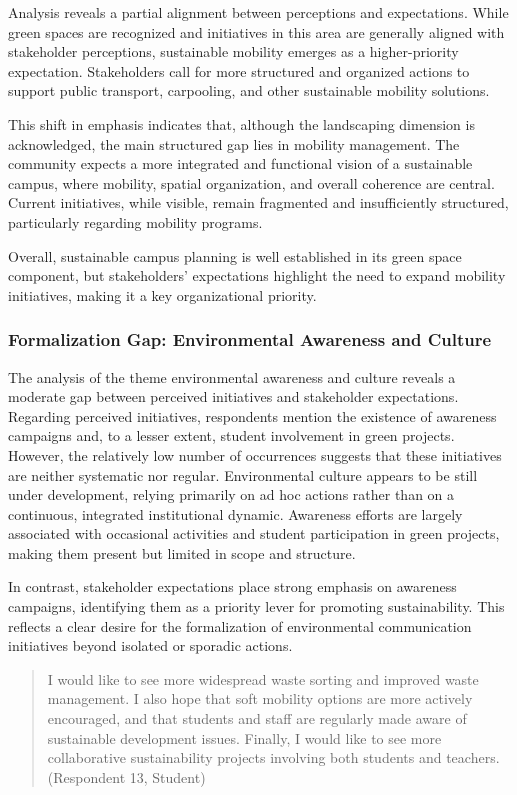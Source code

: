 \documentclass[12pt,a4paper]{article}
\begin{document}
Analysis reveals a partial alignment between perceptions and expectations. While green spaces are recognized and initiatives in this area are generally aligned with stakeholder perceptions, sustainable mobility emerges as a higher-priority expectation. Stakeholders call for more structured and organized actions to support public transport, carpooling, and other sustainable mobility solutions.

This shift in emphasis indicates that, although the landscaping dimension is acknowledged, the main structured gap lies in mobility management. The community expects a more integrated and functional vision of a sustainable campus, where mobility, spatial organization, and overall coherence are central. Current initiatives, while visible, remain fragmented and insufficiently structured, particularly regarding mobility programs.

Overall, sustainable campus planning is well established in its green space component, but stakeholders’ expectations highlight the need to expand mobility initiatives, making it a key organizational priority.

\subsubsection{Formalization Gap: Environmental Awareness and Culture}

The analysis of the theme environmental awareness and culture reveals a moderate gap between perceived initiatives and stakeholder expectations. Regarding perceived initiatives, respondents mention the existence of awareness campaigns and, to a lesser extent, student involvement in green projects. However, the relatively low number of occurrences suggests that these initiatives are neither systematic nor regular. Environmental culture appears to be still under development, relying primarily on ad hoc actions rather than on a continuous, integrated institutional dynamic. Awareness efforts are largely associated with occasional activities and student participation in green projects, making them present but limited in scope and structure.

In contrast, stakeholder expectations place strong emphasis on awareness campaigns, identifying them as a priority lever for promoting sustainability. This reflects a clear desire for the formalization of environmental communication initiatives beyond isolated or sporadic actions.

\begin{quote}
I would like to see more widespread waste sorting and improved waste management. I also hope that soft mobility options are more actively encouraged, and that students and staff are regularly made aware of sustainable development issues. Finally, I would like to see more collaborative sustainability projects involving both students and teachers. (Respondent 13, Student)
\end{quote}
\end{document}

